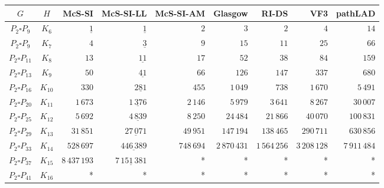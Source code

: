 
\begin{tabular}{ccrrrrrrr}
    \toprule
    {$G$} & {$H$} & {McS-SI} & {McS-SI-LL} & {McS-SI-AM} & Glasgow & RI-DS & VF3 & pathLAD \\ 
    \midrule

$P_2\square P_{9}$ & $K_{6}$ & $\underline{1}$ & $\underline{1}$ & $2$ & $3$ & $2$ & $4$ & $14$\\
$P_2\square P_{9}$ & $K_{7}$ & $4$ & $\underline{3}$ & $9$ & $15$ & $11$ & $25$ & $66$\\
$P_2\square P_{11}$ & $K_{8}$ & $13$ & $\underline{11}$ & $17$ & $52$ & $38$ & $84$ & $159$\\
$P_2\square P_{13}$ & $K_{9}$ & $50$ & $\underline{41}$ & $66$ & $126$ & $147$ & $337$ & $680$\\
$P_2\square P_{16}$ & $K_{10}$ & $330$ & $\underline{281}$ & $455$ & $1\,049$ & $738$ & $1\,670$ & $5\,491$\\
$P_2\square P_{20}$ & $K_{11}$ & $1\,673$ & $\underline{1\,376}$ & $2\,146$ & $5\,979$ & $3\,641$ & $8\,267$ & $30\,007$\\
$P_2\square P_{25}$ & $K_{12}$ & $5\,692$ & $\underline{4\,839}$ & $8\,250$ & $24\,484$ & $21\,866$ & $40\,070$ & $100\,831$\\
$P_2\square P_{29}$ & $K_{13}$ & $31\,851$ & $\underline{27\,071}$ & $49\,951$ & $147\,194$ & $138\,465$ & $290\,711$ & $630\,856$\\
$P_2\square P_{33}$ & $K_{14}$ & $528\,697$ & $\underline{446\,389}$ & $748\,694$ & $2\,870\,431$ & $1\,564\,256$ & $3\,208\,128$ & $7\,911\,484$\\
$P_2\square P_{37}$ & $K_{15}$ & $8\,437\,193$ & $\underline{7\,151\,381}$ & * & * & * & * & *\\
$P_2\square P_{41}$ & $K_{16}$ & * & * & * & * & * & * & *\\

    \bottomrule
\end{tabular}

